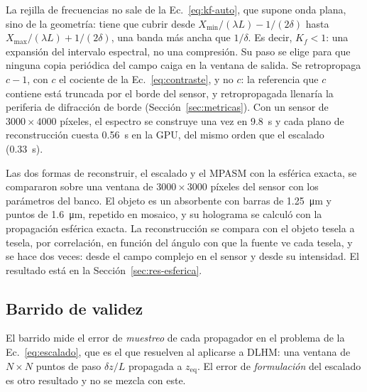 La rejilla de frecuencias no sale de la Ec.~\eqref{eq:kf-auto}, que supone
onda plana, sino de la geometría: tiene que cubrir desde
$X_\mathrm{min}/(\lambda L) - 1/(2\delta)$ hasta
$X_\mathrm{max}/(\lambda L) + 1/(2\delta)$, una banda más ancha que $1/\delta$.
Es decir, $K_f < 1$: una expansión del intervalo espectral, no una compresión.
Su paso se elige para que ninguna copia periódica del campo caiga en la
ventana de salida. Se retropropaga $c - 1$, con $c$ el cociente de la
Ec.~\eqref{eq:contraste}, y no $c$: la referencia que $c$ contiene está truncada por el borde
del sensor, y retropropagada llenaría la periferia de difracción de borde
(Sección~\ref{sec:metricas}). Con un sensor de $3000\times4000$ píxeles, el
espectro se construye una vez en \SI{9.8}{s} y cada plano de reconstrucción
cuesta \SI{0.56}{s} en la GPU, del mismo orden que el escalado
(\SI{0.33}{s}).

Las dos formas de reconstruir, el escalado y el MPASM con la esférica exacta,
se compararon sobre una ventana de $3000\times3000$ píxeles del sensor con los
parámetros del banco. El objeto es un absorbente con barras de
\SI{1.25}{\micro\metre} y puntos de \SI{1.6}{\micro\metre}, repetido en
mosaico, y su holograma se calculó con la propagación esférica exacta. La
reconstrucción se compara con el objeto tesela a tesela, por correlación, en
función del ángulo con que la fuente ve cada tesela, y se hace dos veces:
desde el campo complejo en el sensor y desde su intensidad. El resultado está
en la Sección~\ref{sec:res-esferica}.

\subsection{Barrido de validez}
\label{sec:barrido}

El barrido mide el error de \emph{muestreo} de cada propagador en el problema
de la Ec.~\eqref{eq:escalado}, que es el que resuelven al aplicarse a DLHM: una
ventana de $N\times N$ puntos de paso $\delta z/L$ propagada a $z_\mathrm{eq}$.
El error de \emph{formulación} del escalado es otro resultado y no se mezcla
con este.

